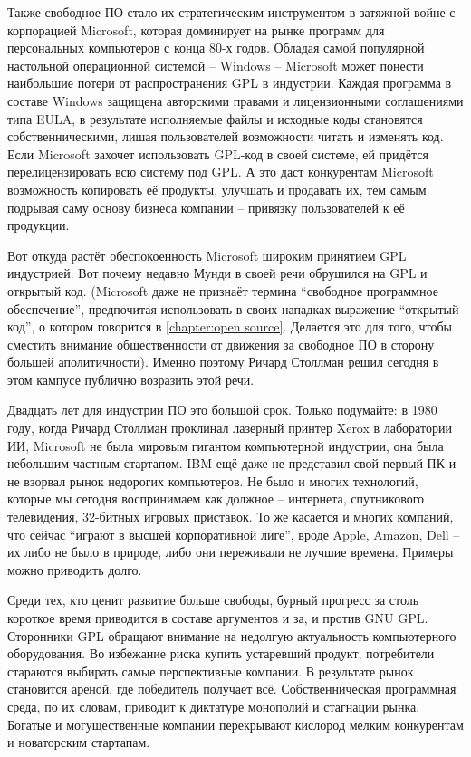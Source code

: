 Также свободное ПО стало их стратегическим инструментом в затяжной войне с корпорацией Microsoft, которая доминирует на рынке программ для персональных компьютеров с конца 80-х годов. Обладая самой популярной настольной операционной системой -- Windows -- Microsoft может понести наибольшие потери от распространения GPL в индустрии. Каждая программа в составе Windows защищена авторскими правами и лицензионными соглашениями типа EULA, в результате исполняемые файлы и исходные коды становятся собственническими, лишая пользователей возможности читать и изменять код. Если Microsoft захочет использовать GPL-код в своей системе, ей придётся перелицензировать всю систему под GPL. А это даст конкурентам Microsoft возможность копировать её продукты, улучшать и продавать их, тем самым подрывая саму основу бизнеса компании -- привязку пользователей к её продукции.

Вот откуда растёт обеспокоенность Microsoft широким принятием GPL индустрией. Вот почему недавно Мунди в своей речи обрушился на GPL и открытый код. (Microsoft даже не признаёт термина \enquote{свободное программное обеспечение}, предпочитая использовать в своих нападках выражение \enquote{открытый код}, о котором говорится в \autoref{chapter:open source}. Делается это для того, чтобы сместить внимание общественности от движения за свободное ПО в сторону большей аполитичности). Именно поэтому Ричард Столлман решил сегодня в этом кампусе публично возразить этой речи.

Двадцать лет для индустрии ПО это большой срок. Только подумайте: в 1980 году, когда Ричард Столлман проклинал лазерный принтер Xerox в лаборатории ИИ, Microsoft не была мировым гигантом компьютерной индустрии, она была небольшим частным стартапом. IBM ещё даже не представил свой первый ПК и не взорвал рынок недорогих компьютеров. Не было и многих технологий, которые мы сегодня воспринимаем как должное -- интернета, спутникового телевидения, 32-битных игровых приставок. То же касается и многих компаний, что сейчас \enquote{играют в высшей корпоративной лиге}, вроде Apple, Amazon, Dell -- их либо не было в природе, либо они переживали не лучшие времена. Примеры можно приводить долго.

Среди тех, кто ценит развитие больше свободы, бурный прогресс за столь короткое время приводится в составе аргументов и за, и против GNU GPL. Сторонники GPL обращают внимание на недолгую актуальность компьютерного оборудования. Во избежание риска купить устаревший продукт, потребители стараются выбирать самые перспективные компании. В результате рынок становится ареной, где победитель получает всё.  Собственническая программная среда, по их словам, приводит к диктатуре монополий и стагнации рынка. Богатые и могущественные компании перекрывают кислород мелким конкурентам и новаторским стартапам.

